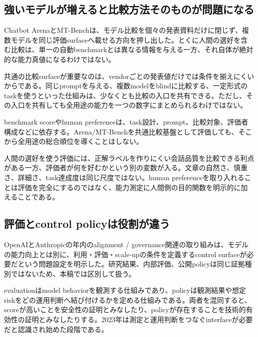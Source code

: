 
\subsection{強いモデルが増えると比較方法そのものが問題になる}

Chatbot ArenaとMT-Benchは、モデル比較を個々の発表資料だけに閉じず、複数モデルを同じ評価surfaceへ載せる方向を押し出した。とくに人間の選好を含む比較は、単一の自動benchmarkとは異なる情報を与える一方、それ自体が絶対的な能力真値になるわけではない。\autocite{src-14f8acc117f1,src-1df7a91d31ec,src-b2d10cbd609c}


共通の比較surfaceが重要なのは、vendorごとの発表値だけでは条件を揃えにくいからである。同じpromptを与える、複数modelをblindに比較する、一定形式のtaskを使うといった仕組みは、少なくとも比較の入口を共有できる。ただし、その入口を共有しても全用途の能力を一つの数字にまとめられるわけではない。\autocite{src-14f8acc117f1,src-1df7a91d31ec,src-b2d10cbd609c}


benchmark scoreやhuman preferenceは、task設計、prompt、比較対象、評価者構成などに依存する。Arena/MT-Benchを共通比較基盤として評価しても、そこから全用途の総合順位を導くことはしない。\autocite{src-14f8acc117f1,src-1df7a91d31ec,src-b2d10cbd609c}


人間の選好を使う評価には、正解ラベルを作りにくい会話品質を比較できる利点がある一方、評価者が何を好むかという別の変数が入る。文章の自然さ、慎重さ、詳細さ、task達成度は同じ尺度ではない。human preferenceを取り入れることは評価を完全にするのではなく、能力測定に人間側の目的関数を明示的に加えることである。\autocite{src-14f8acc117f1,src-1df7a91d31ec,src-b2d10cbd609c}


\subsection{評価とcontrol policyは役割が違う}

OpenAIとAnthropicの年内のalignment / governance関連の取り組みは、モデルの能力向上とは別に、利用・評価・scale-upの条件を定義するcontrol surfaceが必要だという問題設定を明示した。研究結果、内部評価、公開policyは同じ証拠種別ではないため、本稿では区別して扱う。\autocite{src-25adcaa1c831,src-394ea6d17701,src-8f63dfa1697f,src-a1c8df89a3c9,src-b276b4af9d56,src-b6a5fdb87e9f}


evaluationはmodel behaviorを観測する仕組みであり、policyは観測結果や想定riskをどの運用判断へ結び付けるかを定める仕組みである。両者を混同すると、scoreが高いことを安全性の証明とみなしたり、policyが存在することを技術的有効性の証明とみなしたりする。2023年は測定と運用判断をつなぐinterfaceが必要だと認識され始めた段階である。\autocite{src-14f8acc117f1,src-1df7a91d31ec,src-25adcaa1c831,src-394ea6d17701,src-8f63dfa1697f,src-a1c8df89a3c9,src-b276b4af9d56,src-b2d10cbd609c,src-b6a5fdb87e9f}


